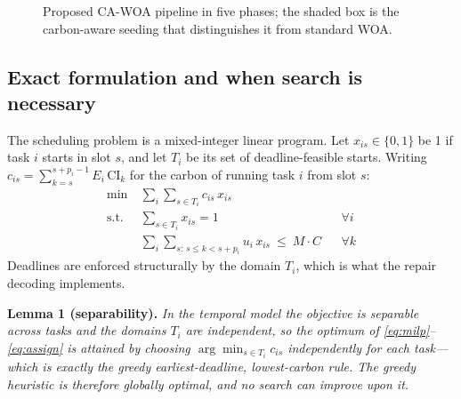 \documentclass[12pt,a4paper]{article}
\providecommand{\DIFaddtex}[1]{{\protect\color{blue} \sf #1}} %
\providecommand{\DIFaddbegin}{} %
\providecommand{\DIFadd}[1]{\texorpdfstring{\DIFaddtex{#1}}{#1}} %
\providecommand{\DIFaddincludegraphics}[2][]{{\color{blue}\fbox{\DIFOincludegraphics[#1]{#2}}}} %
\DeclareRobustCommand{\DIFaddbegin}{\DIFOaddbegin \let\includegraphics\DIFaddincludegraphics} %
\begin{document}
\begin{figure}[H]\centering
{}
\caption{Proposed CA-WOA pipeline in five phases; the shaded box is the carbon-aware seeding that distinguishes it from standard WOA.}\label{fig:cawoa}
\end{figure}

\DIFaddbegin \subsection{\DIFadd{Exact formulation and when search is necessary}}\label{sec:milp}
\DIFadd{The scheduling problem is a mixed-integer linear program. Let $x_{is}\in\{0,1\}$ be 1 if task $i$ starts in
slot $s$, and let $T_i$ be its set of deadline-feasible starts. Writing
$c_{is}=\sum_{k=s}^{s+p_i-1}E_i\,\mathrm{CI}_k$ for the carbon of running task $i$ from slot $s$:
}\begin{align}
\min\ & \textstyle\sum_i\sum_{s\in T_i} c_{is}\,x_{is} \label{eq:milp}\\
\text{s.t.}\ & \textstyle\sum_{s\in T_i} x_{is}=1 && \forall i \label{eq:assign}\\
& \textstyle\sum_i\sum_{s:\,s\le k<s+p_i} u_i\,x_{is}\ \le\ M\!\cdot\!C && \forall k \label{eq:cap}
\end{align}
\DIFadd{Deadlines are enforced structurally by the domain $T_i$, which is what the repair decoding implements.
}

\vspace{2pt}\noindent\DIFadd{\textbf{Lemma 1 (separability).} \emph{In the temporal model the objective is separable
across tasks and the domains $T_i$ are independent, so the optimum of \eqref{eq:milp}--\eqref{eq:assign} is
attained by choosing $\arg\min_{s\in T_i}c_{is}$ independently for each task---which is exactly the greedy
earliest-deadline, lowest-carbon rule. The greedy heuristic is therefore globally optimal, and no search can
improve upon it.}
}
\end{document}
